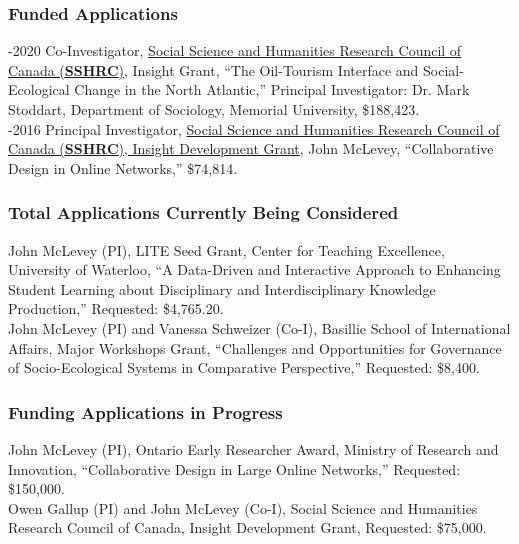 \documentclass[9pt,usenames,dvipsnames]{article}
\begin{document}
\subsubsection*{Funded Applications}

-2020 Co-Investigator, \href{http://www.sshrc-crsh.gc.ca/funding-financement/programs-programmes/insight_development_grants-su
bventions_de_developpement_savoir-eng.aspx}{Social Science and Humanities Research Council of Canada (\textbf{SSHRC})}, Insight Grant, ``The Oil-Tourism Interface and Social-Ecological Change in the North Atlantic,'' Principal Investigator: Dr. Mark Stoddart, Department of Sociology, Memorial University, \$188,423. \\

-2016 Principal Investigator, \href{http://www.sshrc-crsh.gc.ca/funding-financement/programs-programmes/insight_development_grants-su
bventions_de_developpement_savoir-eng.aspx}{Social Science and Humanities Research Council of Canada (\textbf{SSHRC}), Insight Development Grant}, John McLevey, ``Collaborative Design in Online Networks,'' \$74,814.

\subsubsection*{Total Applications Currently Being Considered}

\ind John McLevey (PI), LITE Seed Grant, Center for Teaching Excellence, University of Waterloo, ``A Data-Driven and Interactive Approach to Enhancing Student Learning about Disciplinary and Interdisciplinary Knowledge Production,'' Requested: \$4,765.20. \\

\ind John McLevey (PI) and Vanessa Schweizer (Co-I), Basillie School of International Affairs, Major Workshops Grant, ``Challenges and Opportunities for Governance of Socio-Ecological Systems in Comparative Perspective,'' Requested: \$8,400.  

\subsubsection*{Funding Applications in Progress}

\ind John McLevey (PI), Ontario Early Researcher Award, Ministry of Research and Innovation, ``Collaborative Design in Large Online Networks,'' Requested: \$150,000. \\

\ind Owen Gallup (PI) and John McLevey (Co-I), Social Science and Humanities Research Council of Canada, Insight Development Grant, Requested: \$75,000.
\end{document}
